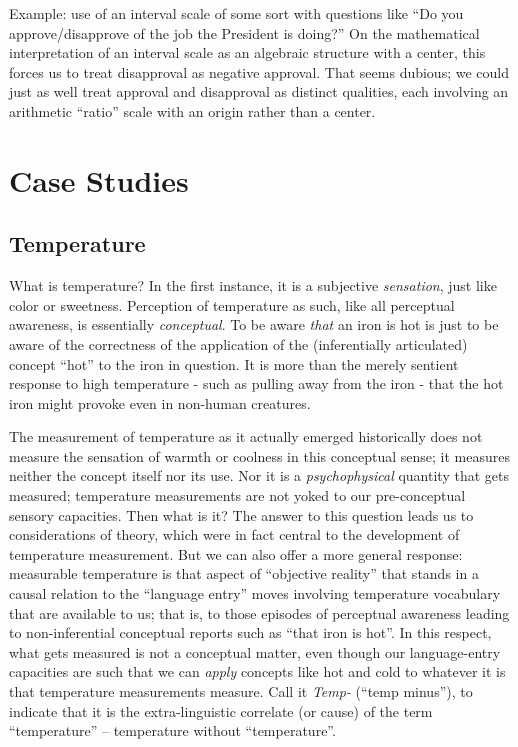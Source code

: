 \documentclass[11pt,twoside]{article}
\begin{document}
Example: use of an interval scale of some sort with questions like
``Do you approve/disapprove of the job the President is doing?''  On
the mathematical interpretation of an interval scale as an algebraic
structure with a center, this forces us to treat disapproval as
negative approval.  That seems dubious; we could just as well treat
approval and disapproval as distinct qualities, each involving
an arithmetic ``ratio'' scale with an origin rather than a center.


\clearpage
\section{Case Studies}

\subsection{Temperature}

What is temperature?  In the first instance, it is a subjective
\textit{sensation}, just like color or sweetness.  Perception of
temperature as such, like all perceptual awareness, is essentially
\textit{conceptual}.  To be aware \textit{that} an iron is hot is just
to be aware of the correctness of the application of the
(inferentially articulated) concept ``hot'' to the iron in question.
It is more than the merely sentient response to high temperature -
such as pulling away from the iron - that the hot iron might provoke
even in non-human creatures.

The measurement of temperature as it actually emerged historically
does not measure the sensation of warmth or coolness in this
conceptual sense; it measures neither the concept itself nor its use.
Nor it is a \textit{psychophysical} quantity that gets measured;
temperature measurements are not yoked to our pre-conceptual sensory
capacities.  Then what is it?  The answer to this question leads us to
considerations of theory, which were in fact central to the
development of temperature measurement.  But we can also offer a more
general response: measurable temperature is that aspect of ``objective
reality'' that stands in a causal relation to the ``language entry''
moves involving temperature vocabulary that are available to us; that
is, to those episodes of perceptual awareness leading to
non-inferential conceptual reports such as ``that iron is hot''.  In
this respect, what gets measured is not a conceptual matter, even
though our language-entry capacities are such that we can
\textit{apply} concepts like hot and cold to whatever it is that
temperature measurements measure.  Call it \textit{Temp-} (``temp
minus''), to indicate that it is the extra-linguistic correlate (or
cause) of the term ``temperature'' -- temperature without
``temperature''.
\end{document}

